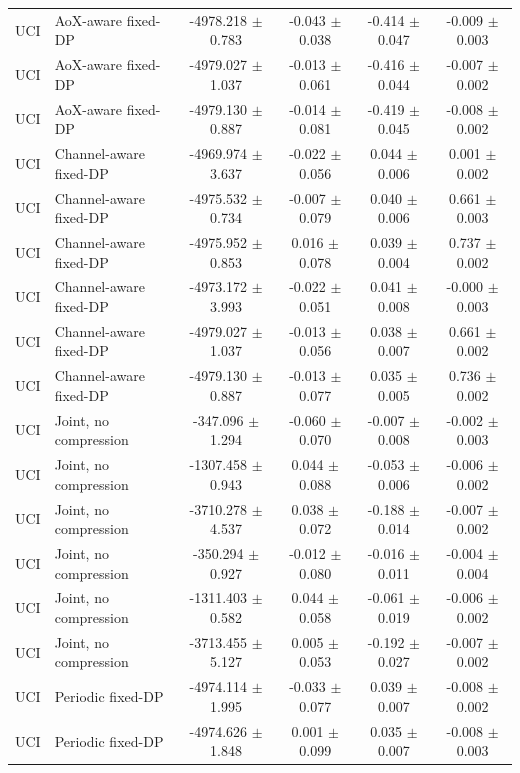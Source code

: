 \begin{tabular}{llcccc}
UCI & AoX-aware fixed-DP & -4978.218 $\pm$ 0.783 & -0.043 $\pm$ 0.038 & -0.414 $\pm$ 0.047 & -0.009 $\pm$ 0.003 \\
UCI & AoX-aware fixed-DP & -4979.027 $\pm$ 1.037 & -0.013 $\pm$ 0.061 & -0.416 $\pm$ 0.044 & -0.007 $\pm$ 0.002 \\
UCI & AoX-aware fixed-DP & -4979.130 $\pm$ 0.887 & -0.014 $\pm$ 0.081 & -0.419 $\pm$ 0.045 & -0.008 $\pm$ 0.002 \\
UCI & Channel-aware fixed-DP & -4969.974 $\pm$ 3.637 & -0.022 $\pm$ 0.056 & 0.044 $\pm$ 0.006 & 0.001 $\pm$ 0.002 \\
UCI & Channel-aware fixed-DP & -4975.532 $\pm$ 0.734 & -0.007 $\pm$ 0.079 & 0.040 $\pm$ 0.006 & 0.661 $\pm$ 0.003 \\
UCI & Channel-aware fixed-DP & -4975.952 $\pm$ 0.853 & 0.016 $\pm$ 0.078 & 0.039 $\pm$ 0.004 & 0.737 $\pm$ 0.002 \\
UCI & Channel-aware fixed-DP & -4973.172 $\pm$ 3.993 & -0.022 $\pm$ 0.051 & 0.041 $\pm$ 0.008 & -0.000 $\pm$ 0.003 \\
UCI & Channel-aware fixed-DP & -4979.027 $\pm$ 1.037 & -0.013 $\pm$ 0.056 & 0.038 $\pm$ 0.007 & 0.661 $\pm$ 0.002 \\
UCI & Channel-aware fixed-DP & -4979.130 $\pm$ 0.887 & -0.013 $\pm$ 0.077 & 0.035 $\pm$ 0.005 & 0.736 $\pm$ 0.002 \\
UCI & Joint, no compression & -347.096 $\pm$ 1.294 & -0.060 $\pm$ 0.070 & -0.007 $\pm$ 0.008 & -0.002 $\pm$ 0.003 \\
UCI & Joint, no compression & -1307.458 $\pm$ 0.943 & 0.044 $\pm$ 0.088 & -0.053 $\pm$ 0.006 & -0.006 $\pm$ 0.002 \\
UCI & Joint, no compression & -3710.278 $\pm$ 4.537 & 0.038 $\pm$ 0.072 & -0.188 $\pm$ 0.014 & -0.007 $\pm$ 0.002 \\
UCI & Joint, no compression & -350.294 $\pm$ 0.927 & -0.012 $\pm$ 0.080 & -0.016 $\pm$ 0.011 & -0.004 $\pm$ 0.004 \\
UCI & Joint, no compression & -1311.403 $\pm$ 0.582 & 0.044 $\pm$ 0.058 & -0.061 $\pm$ 0.019 & -0.006 $\pm$ 0.002 \\
UCI & Joint, no compression & -3713.455 $\pm$ 5.127 & 0.005 $\pm$ 0.053 & -0.192 $\pm$ 0.027 & -0.007 $\pm$ 0.002 \\
UCI & Periodic fixed-DP & -4974.114 $\pm$ 1.995 & -0.033 $\pm$ 0.077 & 0.039 $\pm$ 0.007 & -0.008 $\pm$ 0.002 \\
UCI & Periodic fixed-DP & -4974.626 $\pm$ 1.848 & 0.001 $\pm$ 0.099 & 0.035 $\pm$ 0.007 & -0.008 $\pm$ 0.003 \\

\end{tabular}
